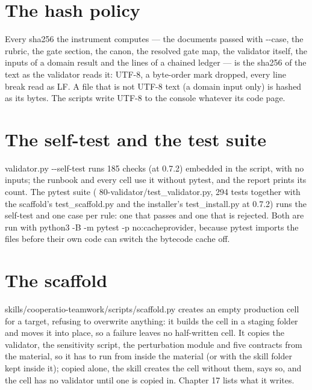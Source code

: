 \documentclass[
  american,
  10pt,
]{report}
\renewcommand{\texttt}[1]{{\ttfamily\hyphenchar\font=-1 #1}}
\begin{document}
\section{The hash policy}\label{the-hash-policy}

Every sha256 the instrument computes --- the documents passed with
\texttt{-\allowbreak{}-\allowbreak{}case}, the rubric, the gate section,
the canon, the resolved gate map, the validator itself, the inputs of a
domain result and the lines of a chained ledger --- is the sha256 of the
text as the validator reads it: UTF-8, a byte-order mark dropped, every
line break read as LF. A file that is not UTF-8 text (a domain input
only) is hashed as its bytes. The scripts write UTF-8 to the console
whatever its code page.

\section{The self-test and the test
suite}\label{the-self-test-and-the-test-suite}

\texttt{validator.\allowbreak{}py -\allowbreak{}-\allowbreak{}self-\allowbreak{}test}
runs 185 checks (at 0.7.2) embedded in the script, with no inputs; the
runbook and every cell use it without pytest, and the report prints its
count. The pytest suite
(\texttt{80-\allowbreak{}validator/\allowbreak{}test\_\allowbreak{}validator.\allowbreak{}py},
294 tests together with the scaffold's
\texttt{test\_\allowbreak{}scaffold.\allowbreak{}py} and the installer's
\texttt{test\_\allowbreak{}install.\allowbreak{}py} at 0.7.2) runs the
self-test and one case per rule: one that passes and one that is
rejected. Both are run with
\texttt{python3 -\allowbreak{}B -\allowbreak{}m pytest -\allowbreak{}p no:\allowbreak{}cacheprovider},
because pytest imports the files before their own code can switch the
bytecode cache off.

\section{The scaffold}\label{the-scaffold}

\texttt{skills/\allowbreak{}cooperatio-\allowbreak{}teamwork/\allowbreak{}scripts/\allowbreak{}scaffold.\allowbreak{}py}
creates an empty production cell for a target, refusing to overwrite
anything: it builds the cell in a staging folder and moves it into
place, so a failure leaves no half-written cell. It copies the
validator, the sensitivity script, the perturbation module and five
contracts from the material, so it has to run from inside the material
(or with the skill folder kept inside it); copied alone, the skill
creates the cell without them, says so, and the cell has no validator
until one is copied in. Chapter 17 lists what it writes.
\end{document}
